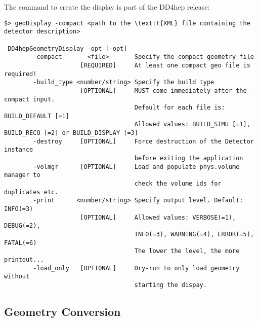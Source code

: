 The command to create the display is part of the DD4hep release:
\begin{verbatim}
$> geoDisplay -compact <path to the \texttt{XML} file containing the detector description>

 DD4hepGeometryDisplay -opt [-opt]                                                  
        -compact       <file>       Specify the compact geometry file              
                     [REQUIRED]     At least one compact geo file is required!     
        -build_type <number/string> Specify the build type                         
                     [OPTIONAL]     MUST come immediately after the -compact input.
                                    Default for each file is: BUILD_DEFAULT [=1]   
                                    Allowed values: BUILD_SIMU [=1], BUILD_RECO [=2] or BUILD_DISPLAY [=3]
        -destroy     [OPTIONAL]     Force destruction of the Detector instance         
                                    before exiting the application                 
        -volmgr      [OPTIONAL]     Load and populate phys.volume manager to       
                                    check the volume ids for duplicates etc.       
        -print      <number/string> Specify output level. Default: INFO(=3)        
                     [OPTIONAL]     Allowed values: VERBOSE(=1), DEBUG(=2),        
                                    INFO(=3), WARNING(=4), ERROR(=5), FATAL(=6)    
                                    The lower the level, the more printout...      
        -load_only   [OPTIONAL]     Dry-run to only load geometry without     
                                    starting the dispay.                      
\end{verbatim}


\subsection{Geometry Conversion}
\label{sec:dd4hep-manual-geometry-conversion}

